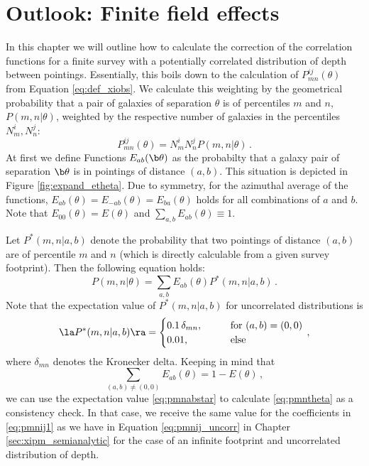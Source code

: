 \chapter{Outlook: Finite field effects}
\label{sec:expand_eoftheta}
\begin{SCfigure}
    \centering
    \def\svgwidth{200pt}    
      
    \caption[Graphic how to obtain $E_{ab}(\theta)$]{Graphic representation of the definitions of $E_{ab}(\theta)$. When the first galaxy is in the bottom left pointing, the probability to find the second galaxy in a pointing of distance $(a,b)$ is $E_{mn}(\theta)$.}
    \label{fig:expand_etheta}
\end{SCfigure}
In this chapter we will outline how to calculate the correction of the correlation functions for a finite survey with a potentially correlated distribution of depth between pointings. Essentially, this boils down to the calculation of $P_{mn}^{ij}(\theta)$ from Equation \eqref{eq:def_xiobs}. We calculate this weighting by the geometrical probability that a pair of galaxies of separation $\theta$ is of percentiles $m$ and $n$, $P(m,n|\theta)$, weighted by the respective number of galaxies in the percentiles $N_m^i,N_n^j$: \[
P_{mn}^{ij}(\theta) = N_m^iN_n^jP(m,n|\theta)\, .
\label{eq:pmnij1}
\]
 At first we define Functions $E_{ab}(\b\theta)$ as the probabilty that a galaxy pair of separation $\b\theta$ is in pointings of distance $(a,b)$. This situation is depicted in Figure \ref{fig:expand_etheta}. Due to symmetry, for the azimuthal average of the functions, $E_{ab}(\theta) = E_{-ab}(\theta) = E_{ba}(\theta)$ holds for all combinations of $a$ and $b$. Note that $E_{00}(\theta)=E(\theta)$ and $\sum_{a,b}E_{ab}(\theta)\equiv 1$.

Let $P^*(m,n|a,b)$ denote the probability that two pointings of distance $(a,b)$ are of percentile $m$ and $n$ (which is directly calculable from a given survey footprint). 
Then the following equation holds: \[
P(m,n|\theta) = \sum_{a,b} E_{ab}(\theta)P^*(m,n|a,b)\, .
\label{eq:pmntheta}
\]
Note that the expectation value of $P^*(m,n|a,b)$ for uncorrelated distributions is \[
\la P^*(m,n|a,b)\ra = \begin{cases}
0.1\,\delta_{mn},\qquad & \text{for }(a,b)=(0,0) \\
0.01, & \text{else}
\end{cases}\, ,
\label{eq:pmnabstar}
\]
where $\delta_{mn}$ denotes the Kronecker delta. Keeping in mind that \[
\sum_{(a,b)\neq (0,0)} E_{ab}(\theta) = 1-E(\theta)\, ,
\]
we can use the expectation value \eqref{eq:pmnabstar} to calculate \eqref{eq:pmntheta} as a consistency check. In that case, we receive the same value for the coefficients in \eqref{eq:pmnij1} as we have in Equation \eqref{eq:pmnij_uncorr} in Chapter \ref{sec:xipm_semianalytic} for the case of an infinite footprint and uncorrelated distribution of depth.

